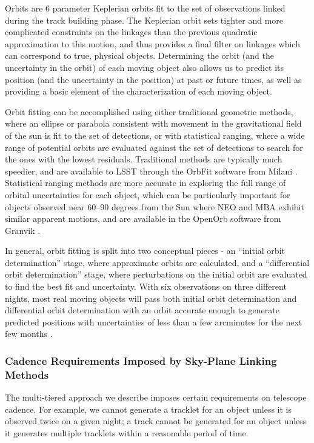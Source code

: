 \documentclass[12pt,preprint]{aastex}
\begin{document}
Orbits are 6 parameter Keplerian orbits fit to the set of
observations linked during the track building phase. The Keplerian
orbit sets tighter and more complicated constraints on the linkages
than the previous quadratic approximation to this motion, and thus
provides a final filter on linkages which can correspond to true,
physical objects. Determining the orbit (and the uncertainty in the
orbit) of each moving object also allows us to predict its position
(and the uncertainty in the position) at past or future times, as well
as providing a basic element of the characterization of each moving
object.

Orbit fitting can be accomplished using either traditional geometric
methods, where an ellipse or parabola consistent with movement in the
gravitational field of the sun is fit to the set of detections, or
with statistical ranging, where a wide range of potential orbits are
evaluated against the set of detections to search for the ones with
the lowest residuals. Traditional methods are typically much speedier,
and are available to LSST through the OrbFit software from Milani
\citep{Milani2006}. Statistical ranging methods are more accurate in
exploring the full range of orbital uncertainties for each object,
which can be particularly important for objects observed near 60--90
degrees from the Sun where NEO and MBA exhibit similar apparent
motions, and are available in the OpenOrb software from Granvik
\citep{OpenOrb2009}.

In general, orbit fitting is split into two conceptual pieces - an
``initial orbit determination'' stage, where approximate orbits are
calculated, and a ``differential orbit determination'' stage, where
perturbations on the initial orbit are evaluated to find the best fit
and uncertainty. With six observations on three different nights, most
real moving objects will pass both initial orbit determination and
differential orbit determination with an orbit accurate enough to
generate predicted positions with uncertainties of less than a few
arcminutes for the next few months \citep{basicSolarSystem}.



\subsubsection{Cadence Requirements Imposed by Sky-Plane Linking Methods}
\label{cadenceRequirements}
The multi-tiered approach we describe imposes certain requirements on
telescope cadence.  For example, we cannot generate a tracklet for an
object unless it is observed twice on a given night; a track cannot be
generated for an object unless it generates multiple tracklets within
a reasonable period of time.
\end{document}
